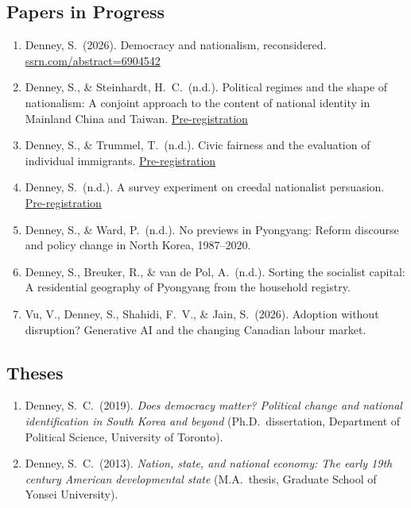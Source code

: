 \documentclass[11pt, a4paper]{article}
\begin{document}
\subsection{Papers in Progress}

\begin{enumerate}[itemsep=0.15em]
  \item Denney, S.\ (2026). Democracy and nationalism, reconsidered. \href{https://ssrn.com/abstract=6904542}{ssrn.com/abstract=6904542}

  \item Denney, S., \& Steinhardt, H.\ C.\ (n.d.). Political regimes and the shape of nationalism: A conjoint approach to the content of national identity in Mainland China and Taiwan. \href{https://scdenney.github.io/assets/preregistrations/political-regimes-nationalism/}{Pre-registration}

  \item Denney, S., \& Trummel, T.\ (n.d.). Civic fairness and the evaluation of individual immigrants. \href{https://scdenney.github.io/assets/preregistrations/civic-fairness/}{Pre-registration}


  \item Denney, S.\ (n.d.). A survey experiment on creedal nationalist persuasion. \href{https://scdenney.github.io/assets/preregistrations/creedal-persuasion/}{Pre-registration}

  \item Denney, S., \& Ward, P.\ (n.d.). No previews in Pyongyang: Reform discourse and policy change in North Korea, 1987--2020.

  \item Denney, S., Breuker, R., \& van de Pol, A.\ (n.d.). Sorting the socialist capital: A residential geography of Pyongyang from the household registry.

  \item Vu, V., Denney, S., Shahidi, F.\ V., \& Jain, S.\ (2026). Adoption without disruption? Generative AI and the changing Canadian labour market.
\end{enumerate}

\subsection{Theses}

\begin{enumerate}[itemsep=0.15em]
  \item Denney, S.\ C.\ (2019). \textit{Does democracy matter? Political change and national identification in South Korea and beyond} (Ph.D.\ dissertation, Department of Political Science, University of Toronto).

  \item Denney, S.\ C.\ (2013). \textit{Nation, state, and national economy: The early 19th century American developmental state} (M.A.\ thesis, Graduate School of Yonsei University).
\end{enumerate}
\end{document}
